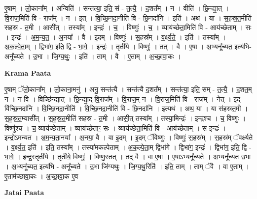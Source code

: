 \documentclass[17pt]{extarticle}
\begin{document}
ए॒षाम् । लो॒काना᳚म् । अन्विति॑ । सन्त॑त्या॒ इति॒ सं - त॒त्यै॒ । द॒शत᳚म् । न । वीति॑ । छि॒न्द्या॒त् । वि॒राज॒मिति॑ वि - राज᳚म् । न । इत् । वि॒च्छि॒नदा॒नीति॑ वि - छि॒नदा॑नि । इति॑ । अथ॑ । या । स॒ह॒स्र॒त॒मीति॑ सहस्र - त॒मी । आसी᳚त् । तस्या᳚म् । इन्द्रः॑ । च॒ । विष्णुः॑ । च॒ । व्याय॑च्छेता॒मिति॑ वि - आय॑च्छेताम् । सः । इन्द्रः॑ । अ॒म॒न्य॒त॒ । अ॒नया᳚ । वै । इ॒दम् । विष्णुः॑ । स॒हस्र᳚म् । व॒र्क्ष्य॒ते॒ । इति॑ । तस्या᳚म् । अ॒क॒ल्पे॒ता॒म् । द्विभा॑ग॒ इति॒ द्वि - भा॒गे॒ । इन्द्रः॑ । तृती॑ये । विष्णुः॑ । तत् । वै । ए॒षा । अ॒भ्यनू᳚च्यत॒ इत्य॑भि-अनू᳚च्यते । उ॒भा । जि॒ग्य॒थुः॒ । इति॑ । ताम् । वै । ए॒ताम् । अ॒च्छा॒वा॒कः ।  \newline


\textbf{Krama Paata} \newline

ए॒षाम् ॅलो॒काना᳚म् । लो॒काना॒मनु॑ । अनु॒ सन्त॑त्यै । सन्त॑त्यै द॒शत᳚म् । सन्त॑त्या॒ इति॒ सम् - त॒त्यै॒ । द॒शत॒म् न । न वि । विच्छि॑न्द्यात् । छि॒न्द्या॒द् वि॒राज᳚म् । वि॒राज॒म् न । वि॒राज॒मिति॑ वि - राज᳚म् । नेत् । इद् वि॑च्छि॒नदा॑नि । वि॒च्छि॒नदा॒नीति॑ । वि॒च्छि॒नदा॒नीति॑ वि - छि॒नदा॑नि । इत्यथ॑ । अथ॒ या । या स॑हस्रत॒मी । स॒ह॒स्र॒त॒म्यासी᳚त् । स॒ह॒स्र॒त॒मीति॑ सहस्र - त॒मी । आसी॒त् तस्या᳚म् । तस्या॒मिन्द्रः॑ । इन्द्र॑श्च । च॒ विष्णुः॑ । विष्णु॑श्च । च॒ व्याय॑च्छेताम् । व्याय॑च्छेताꣳ॒॒ सः । व्याय॑च्छेता॒मिति॑ वि - आय॑च्छेताम् । स इन्द्रः॑ । इन्द्रो॑ऽमन्यत । अ॒म॒न्य॒ता॒नया᳚ । अ॒नया॒ वै । वा इ॒दम् । इ॒दम् ॅविष्णुः॑ । विष्णुः॑ स॒हस्र᳚म् । स॒हस्र॑म् ॅवर्क्ष्यते । व॒र्क्ष्य॒त॒ इति॑ । इति॒ तस्या᳚म् । तस्या॑मकल्पेताम् । अ॒क॒ल्पे॒ता॒म् द्विभा॑गे । द्विभा॑ग॒ इन्द्रः॑ । द्विभा॑ग॒ इति॒ द्वि - भा॒गे॒ । इन्द्र॒स्तृती॑ये । तृती॑ये॒ विष्णुः॑ । विष्णु॒स्तत् । तद् वै । वा ए॒षा । ए॒षाऽभ्यनू᳚च्यते । अ॒भ्यनू᳚च्यत उ॒भा । अ॒भ्यनू᳚च्यत॒ इत्य॑भि - अनू᳚च्यते । उ॒भा जि॑ग्यथुः । जि॒ग्य॒थु॒रिति॑ । इति॒ ताम् । ताम् ॅवै । वा ए॒ताम् । ए॒ताम॑च्छावा॒कः । अ॒च्छा॒वा॒क ए॒व \newline

\textbf{Jatai Paata} \newline
\end{document}
